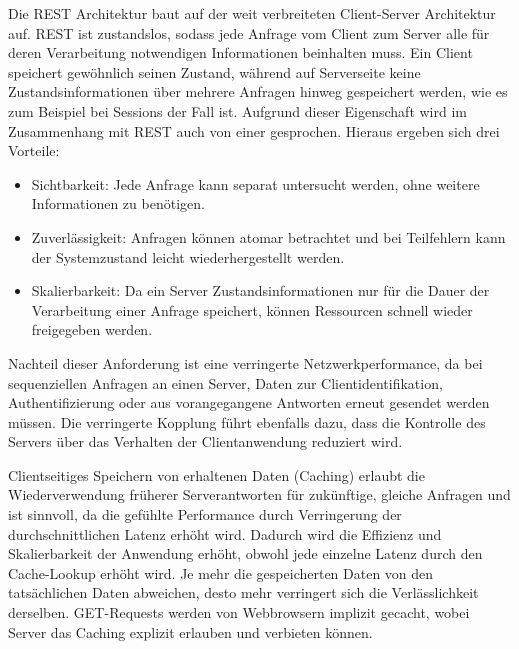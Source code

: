 Die REST Architektur baut auf der weit verbreiteten Client-Server Architektur auf.
REST ist zustandslos, sodass jede Anfrage vom Client zum Server alle für deren Verarbeitung notwendigen Informationen beinhalten muss.
Ein Client speichert gewöhnlich seinen Zustand, während auf Serverseite keine Zustandsinformationen über mehrere Anfragen hinweg gespeichert werden, wie es zum Beispiel bei Sessions der Fall ist.
Aufgrund dieser Eigenschaft wird im Zusammenhang mit REST auch von einer  gesprochen.
Hieraus ergeben sich drei Vorteile:\cite[vgl.][79]{REST}
\begin{itemize}
  \item Sichtbarkeit:
  Jede Anfrage kann separat untersucht werden, ohne weitere Informationen zu benötigen.
  \item Zuverlässigkeit:
  Anfragen können atomar betrachtet und bei Teilfehlern kann der Systemzustand leicht wiederhergestellt werden.
  \item Skalierbarkeit:
  Da ein Server Zustandsinformationen nur für die Dauer der Verarbeitung einer Anfrage speichert, können Ressourcen schnell wieder freigegeben werden.
\end{itemize}
Nachteil dieser Anforderung ist eine verringerte Netzwerkperformance, da bei sequenziellen Anfragen an einen Server, Daten zur Clientidentifikation, Authentifizierung oder aus vorangegangene Antworten erneut gesendet werden müssen.
Die verringerte Kopplung führt ebenfalls dazu, dass die Kontrolle des Servers über das Verhalten der Clientanwendung reduziert wird.
\par
Clientseitiges Speichern von erhaltenen Daten (Caching) erlaubt die Wiederverwendung früherer Serverantworten für zukünftige, gleiche Anfragen und ist sinnvoll, da die gefühlte Performance durch Verringerung der durchschnittlichen Latenz erhöht wird.
Dadurch wird die Effizienz und Skalierbarkeit der Anwendung erhöht, obwohl jede einzelne Latenz durch den Cache-Lookup erhöht wird.
Je mehr die gespeicherten Daten von den tatsächlichen Daten abweichen, desto mehr verringert sich die Verlässlichkeit derselben.\cite[vgl.][80]{REST}
GET-Requests werden von Webbrowsern implizit gecacht, wobei Server das Caching explizit erlauben und verbieten können.

